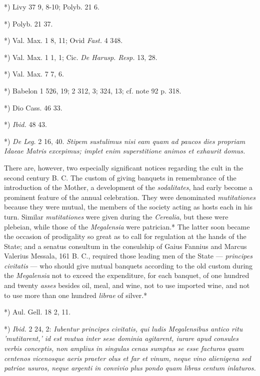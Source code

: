 \documentclass[a4paper, 11pt, oneside, polutonikogreek, english]{article}
\begin{document}
*) Livy 37 9, 8-10; Polyb. 21 6.

*) Polyb. 21 37.

*) Val. Max. 1 8, 11; Ovid \emph{Fast.} 4 348.

*) Val. Max. 1 1, 1; Cic. \emph{De Harusp. Resp.} 13, 28.

*) Val. Max. 7 7, 6.

*) Babelon 1 526, 19; 2 312, 3; 324, 13; cf. note 92 p. 318.

*) Dio Cass. 46 33.

*) \emph{Ibid.} 48 43.

*) \emph{De Leg.} 2 16, 40. \emph{Stipem sustulimus nisi eam quam ad paucos dies propriam Idaeae Matris excepimus; implet enim superstitione animos et exhaurit domus.}

There are, however, two especially significant notices regarding the cult in the second century B. C. The custom of giving banquets in remembrance of the introduction of the Mother, a development of the \emph{sodalitates}, had early become a prominent feature of the annual celebration. They were denominated \emph{mutitationes} because they were mutual, the members of the society acting as hosts each in his turn. Similar \emph{mutitationes} were given during the \emph{Cerealia}, but these were plebeian, while those of the \emph{Megalensia} were patrician.* The latter soon became the occasion of prodigality so great as to call for regulation at the hands of the State; and a senatus consultum in the consulship of Gaius Fannius and Marcus Valerius Messala, 161 B. C., required those leading men of the State --- \emph{principes civitatis} --- who should give mutual banquets according to the old custom during the \emph{Megalensia} not to exceed the expenditure, for each banquet, of one hundred and twenty \emph{asses} besides oil, meal, and wine, not to use imported wine, and not to use more than one hundred \emph{librae} of silver.*

*) Aul. Gell. 18 2, 11.

*) \emph{Ibid.} 2 24, 2: \emph{Iubentur principes civitatis, qui ludis Megalensibus antico ritu 'mutitarent,' id est mutua inter sese dominia agitarent, iurare apud consules verbis conceptis, non amplius in singulas cenas sumptus se esse facturos quam centenos vicenosque aeris praeter olus et far et vinum, neque vino alienigena sed patriae usuros, neque argenti in convivio plus pondo quam libras centum inlaturos.}
\end{document}
